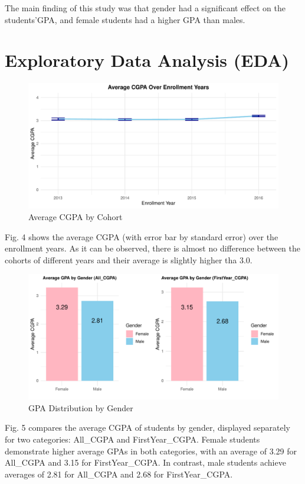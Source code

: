 \documentclass[
  12pt,
]{article}
\begin{document}
The main finding of this study was that gender had a significant effect
on the students'GPA, and female students had a higher GPA than males.

\section{Exploratory Data Analysis
(EDA)}\label{exploratory-data-analysis-eda}

\begin{figure}
\includegraphics[width=0.9\linewidth]{iesm315_report_files/figure-latex/unnamed-chunk-8-1} \caption{Average CGPA by Cohort}\label{fig:unnamed-chunk-8}
\end{figure}

Fig. 4 shows the average CGPA (with error bar by standard error) over
the enrollment years. As it can be observed, there is almost no
difference between the cohorts of different years and their average is
slightly higher tha 3.0.

\begin{figure}
\includegraphics[width=0.9\linewidth]{iesm315_report_files/figure-latex/unnamed-chunk-9-1} \caption{GPA Distribution by Gender}\label{fig:unnamed-chunk-9}
\end{figure}

Fig. 5 compares the average CGPA of students by gender, displayed
separately for two categories: All\_CGPA and FirstYear\_CGPA. Female
students demonstrate higher average GPAs in both categories, with an
average of 3.29 for All\_CGPA and 3.15 for FirstYear\_CGPA. In contrast,
male students achieve averages of 2.81 for All\_CGPA and 2.68 for
FirstYear\_CGPA.
\end{document}
